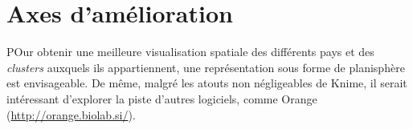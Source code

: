 \vfil
\pagebreak
\section{Axes d'amélioration}

POur obtenir une meilleure visualisation spatiale des différents
pays et des {\sl clusters} auxquels ils appartiennent, une représentation
sous forme de planisphère est envisageable.
De même, malgré les atouts non négligeables de Knime, il serait intéressant
d'explorer la piste d'autres logiciels, comme Orange (\url{http://orange.biolab.si/}).

